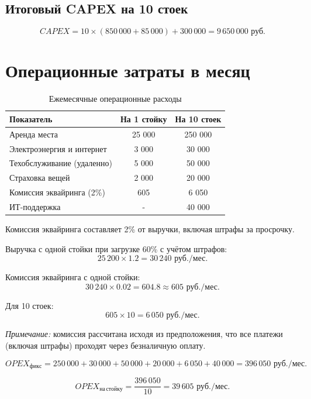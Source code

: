 \documentclass[12pt,a4paper]{article}
\begin{document}
\subsection{Итоговый CAPEX на 10 стоек}
\begin{equation}
CAPEX = 10 \times (850\,000 + 85\,000) + 300\,000 = 9\,650\,000 \text{ руб.}
\end{equation}

\section{Операционные затраты в месяц}
\begin{table}[H]
\centering
\caption{Ежемесячные операционные расходы}
\begin{tabular}{@{}lcc@{}}
\toprule
Показатель & На 1 стойку & На 10 стоек \\
\midrule
Аренда места & 25 000 & 250 000 \\
Электроэнергия и интернет & 3 000 & 30 000 \\
Техобслуживание (удаленно) & 5 000 & 50 000 \\
Страховка вещей & 2 000 & 20 000 \\
Комиссия эквайринга (2\%) & 605 & 6 050 \\
ИТ-поддержка  & - & 40 000 \\
\bottomrule
\end{tabular}
\end{table}

Комиссия эквайринга составляет 2\% от выручки, включая штрафы за просрочку.

Выручка с одной стойки при загрузке 60\% с учётом штрафов:
\[
25\,200 \times 1.2 = 30\,240 \text{ руб./мес.}
\]

Комиссия эквайринга с одной стойки:
\[
30\,240 \times 0.02 = 604.8 \approx 605 \text{ руб./мес.}
\]

Для 10 стоек:
\[
605 \times 10 = 6\,050 \text{ руб./мес.}
\]

\textit{Примечание:} комиссия рассчитана исходя из предположения, что все платежи (включая штрафы) проходят через безналичную оплату.

\[
OPEX_{фикс} = 250\,000 + 30\,000 + 50\,000 + 20\,000 + 6\,050 + 40\,000 = 396\,050 \text{ руб./мес.}
\]

\[
OPEX_{на\,стойку} = \frac{396\,050}{10} = 39\,605 \text{ руб./мес.}
\]

\end{document}
